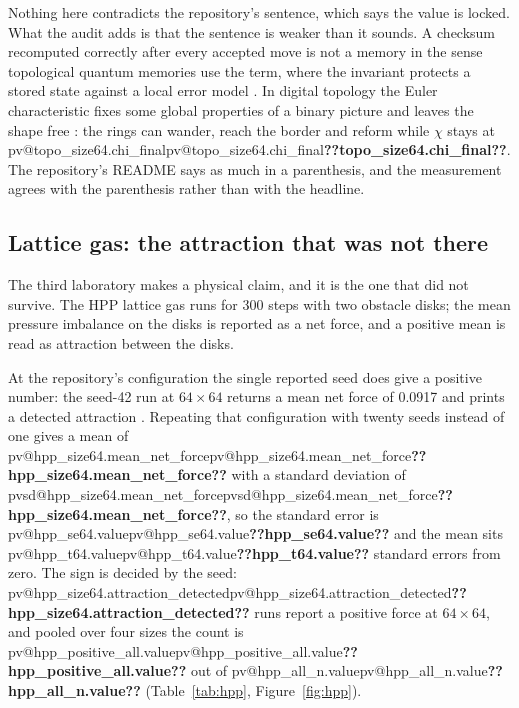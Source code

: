 \documentclass[11pt,a4paper]{article}
\makeatletter
\newcommand{\val}[1]{\ifcsname pv@#1\endcsname\csname pv@#1\endcsname\else\textbf{??#1??}\fi}
\newcommand{\valsd}[1]{\ifcsname pvsd@#1\endcsname\csname pvsd@#1\endcsname\else\textbf{??#1??}\fi}
\makeatother
\begin{document}
Nothing here contradicts the repository's sentence, which says the value is locked. What the
audit adds is that the sentence is weaker than it sounds. A checksum recomputed correctly after
every accepted move is not a memory in the sense topological quantum memories use the term, where
the invariant protects a stored state against a local error model \citep{kitaev2003,dennis2002}.
In digital topology the Euler characteristic fixes some global properties of a binary picture and
leaves the shape free \citep{kong1989}: the rings can wander, reach the border and reform while
$\chi$ stays at \val{topo_size64.chi_final}. The repository's README says as much in a
parenthesis, and the measurement agrees with the parenthesis rather than with the headline.

\subsection{Lattice gas: the attraction that was not there}
\label{sec:hpp}

The third laboratory makes a physical claim, and it is the one that did not survive. The HPP
lattice gas \citep{hardy1976} runs for 300 steps with two obstacle disks; the mean pressure
imbalance on the disks is reported as a net force, and a positive mean is read as attraction
between the disks.

At the repository's configuration the single reported seed does give a positive number: the
seed-42 run at $64\times64$ returns a mean net force of 0.0917 and prints a detected attraction
\citep{timelockca}. Repeating that configuration with twenty seeds instead of one gives a mean of
\val{hpp_size64.mean_net_force} with a standard deviation of \valsd{hpp_size64.mean_net_force},
so the standard error is \val{hpp_se64.value} and the mean sits \val{hpp_t64.value} standard
errors from zero. The sign is decided by the seed: \val{hpp_size64.attraction_detected} runs
report a positive force at $64\times64$, and pooled over four sizes the count is
\val{hpp_positive_all.value} out of \val{hpp_all_n.value} (Table~\ref{tab:hpp},
Figure~\ref{fig:hpp}).
\end{document}
